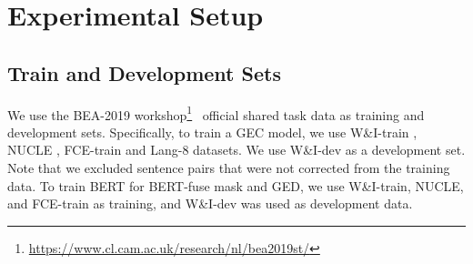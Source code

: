 \documentclass[11pt,a4paper]{article}
\begin{document}
\begin{table}[]
\centering
{}\caption{Hyperparameters values of GEC model and Fine-tuned BERT.}
\label{tab:params}
\end{table}


\section{Experimental Setup}
\subsection{Train and Development Sets}
We use the BEA-2019 workshop\footnote{\url{https://www.cl.cam.ac.uk/research/nl/bea2019st/}}~\cite{bryant-etal-2019-bea} official shared task data as training and development sets.
Specifically, to train a GEC model, we use W\&I-train \cite{Granger-1998, yannakoudakis-etal-2018}, NUCLE \cite{dahlmeier-etal-2013-building}, FCE-train \cite{yannakoudakis-etal-2011-new} and Lang-8 \cite{mizumoto-etal-2011-mining} datasets.
We use W\&I-dev as a development set.
Note that we excluded sentence pairs that were not corrected from the training data. 
To train BERT for BERT-fuse mask and GED, we use W\&I-train, NUCLE, and FCE-train as training, and W\&I-dev was used as development data.
\end{document}
